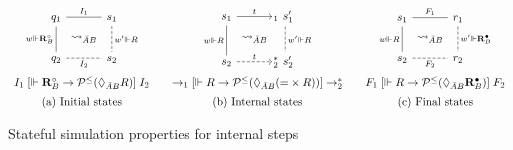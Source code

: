 \documentclass[acmsmall,screen,review,anonymous]{acmart}
\newcommand{\ifr}[1]{\mathrel{[{#1}]}}
\newcommand{\que}{\circ}
\newcommand{\ans}{\bullet}
\begin{document}
\begin{figure}[h] %
  \small
  \[
    \begin{array}{c@{\qquad}c@{\qquad}c}
      \begin{tikzcd}[sep=tiny,column sep=0]
        q_1 \ar[dd, "w \Vdash \mathbf{R}_B^\que"', dash] \ar[rr, dash, "I_1"] &&
        s_1 \ar[dd, "w' \Vdash R", dash, dashed] \\
        & \leadsto_{\bar{A}B} & \\
        q_2 \ar[rr, "I_2"', dash, dashed] &&
        s_2
      \end{tikzcd}
      &
      \begin{tikzcd}[sep=tiny,column sep=0]
        s_1 \ar[rr, "t"] \ar[dd, "w \Vdash R"', dash] &&
        \!\!{}_1 \:\, s_1' \ar[dd, "w' \Vdash R", dash, dashed] \\
        & \leadsto_{\bar{A}B} & \\
        s_2 \ar[rr, "t", dashed] &&
        \!\!{}_2^* \:\, s_2'
      \end{tikzcd}
      &
      \begin{tikzcd}[sep=tiny, column sep=0]
        s_1 \ar[rr, "F_1", dash] \ar[dd, "w \Vdash R"', dash] &&
        r_1 \ar[dd, "w' \Vdash \mathbf{R}_B^\ans", dash, dashed] \\
        & \leadsto_{\bar{A}B} & \\
        s_2 \ar[rr, "F_2"', dash, dashed] &&
        r_2
      \end{tikzcd}
      \vspace{1ex} \\
      I_1 \ifr{\Vdash \mathbf{R}_B^\que \rightarrow
        \mathcal{P}^\le(\Diamond_{\bar{A}B} R)} I_2
      &
      {\rightarrow_1}
      \ifr{\Vdash R \rightarrow \mathcal{P}^\le(\Diamond_{\bar{A}B} ({=} \times R))}
      {\rightarrow_2^*}
      &
      F_1
      \ifr{\Vdash R \rightarrow \mathcal{P}^\le(\Diamond_{\bar{A}B} \mathbf{R}_B^\ans)}
      F_2
      \vspace{1.2ex} \\
      \text{(a) Initial states} &
      \text{(b) Internal states} &
      \text{(c) Final states}
    \end{array}
  \]
  \caption{Stateful simulation properties for internal steps}
  \label{fig:simint}
\end{figure}
\end{document}
